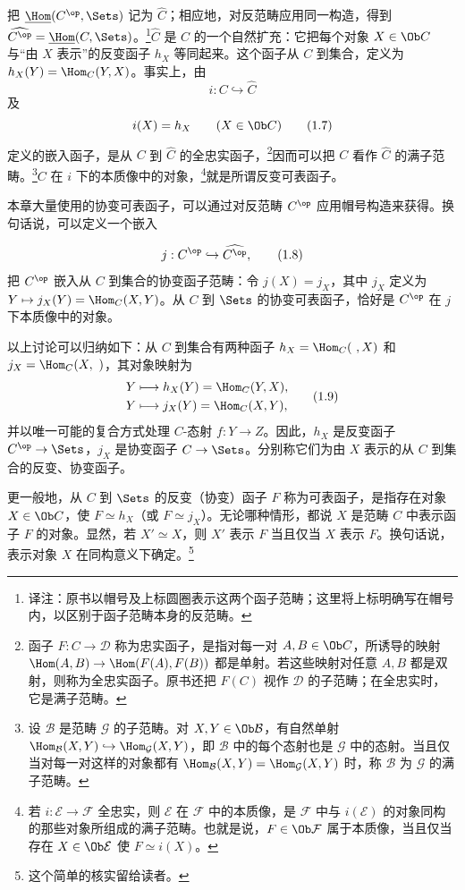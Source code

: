 把 $\underline{\Hom}(C^{\op},\Sets)$ 记为 $\widehat C$；相应地，对反范畴应用同一构造，得到 $\widehat{C^{\op}}=\underline{\Hom}(C,\Sets)$。\footnote{译注：原书以帽号及上标圆圈表示这两个函子范畴；这里将上标明确写在帽号内，以区别于函子范畴本身的反范畴。}$\widehat C$ 是 $C$ 的一个自然扩充：它把每个对象 $X\in\Ob C$ 与“由 $X$ 表示”的反变函子 $h_X$ 等同起来。这个函子从 $C$ 到集合，定义为 $h_X(Y)=\Hom_C(Y,X)$。事实上，由
\[
i:C\hookrightarrow\widehat C\tag{1.6}
\]
及
\[
i(X)=h_X\qquad(X\in\Ob C)\tag{1.7}
\]
定义的嵌入函子，是从 $C$ 到 $\widehat C$ 的全忠实函子，\footnote{函子 $F:C\to\mathcal D$ 称为忠实函子，是指对每一对 $A,B\in\Ob C$，所诱导的映射 $\Hom(A,B)\to\Hom(F(A),F(B))$ 都是单射。若这些映射对任意 $A,B$ 都是双射，则称为全忠实函子。原书还把 $F(C)$ 视作 $\mathcal D$ 的子范畴；在全忠实时，它是满子范畴。}因而可以把 $C$ 看作 $\widehat C$ 的满子范畴。\footnote{设 $\mathcal B$ 是范畴 $\mathcal G$ 的子范畴。对 $X,Y\in\Ob\mathcal B$，有自然单射 $\Hom_{\mathcal B}(X,Y)\hookrightarrow\Hom_{\mathcal G}(X,Y)$，即 $\mathcal B$ 中的每个态射也是 $\mathcal G$ 中的态射。当且仅当对每一对这样的对象都有 $\Hom_{\mathcal B}(X,Y)=\Hom_{\mathcal G}(X,Y)$ 时，称 $\mathcal B$ 为 $\mathcal G$ 的满子范畴。}$C$ 在 $i$ 下的本质像中的对象，\footnote{若 $i:\mathcal E\to\mathcal F$ 全忠实，则 $\mathcal E$ 在 $\mathcal F$ 中的本质像，是 $\mathcal F$ 中与 $i(\mathcal E)$ 的对象同构的那些对象所组成的满子范畴。也就是说，$F\in\Ob\mathcal F$ 属于本质像，当且仅当存在 $X\in\Ob\mathcal E$ 使 $F\simeq i(X)$。}就是所谓反变可表函子。

本章大量使用的协变可表函子，可以通过对反范畴 $C^{\op}$ 应用帽号构造来获得。换句话说，可以定义一个嵌入

\[
j:C^{\op}\hookrightarrow\widehat{C^{\op}},\tag{1.8}
\]
把 $C^{\op}$ 嵌入从 $C$ 到集合的协变函子范畴：令 $j(X)=j_X$，其中 $j_X$ 定义为 $Y\mapsto j_X(Y)=\Hom_C(X,Y)$。从 $C$ 到 $\Sets$ 的协变可表函子，恰好是 $C^{\op}$ 在 $j$ 下本质像中的对象。

以上讨论可以归纳如下：从 $C$ 到集合有两种函子 $h_X=\Hom_C(\ ,X)$ 和 $j_X=\Hom_C(X,\ )$，其对象映射为
\[
\begin{aligned}
Y&\longmapsto h_X(Y)=\Hom_C(Y,X),\\
Y&\longmapsto j_X(Y)=\Hom_C(X,Y),
\end{aligned}\tag{1.9}
\]
并以唯一可能的复合方式处理 $C$-态射 $f:Y\to Z$。因此，$h_X$ 是反变函子 $C^{\op}\to\Sets$，$j_X$ 是协变函子 $C\to\Sets$。分别称它们为由 $X$ 表示的从 $C$ 到集合的反变、协变函子。

更一般地，从 $C$ 到 $\Sets$ 的反变（协变）函子 $F$ 称为可表函子，是指存在对象 $X\in\Ob C$，使 $F\simeq h_X$（或 $F\simeq j_X$）。无论哪种情形，都说 $X$ 是范畴 $C$ 中表示函子 $F$ 的对象。显然，若 $X'\simeq X$，则 $X'$ 表示 $F$ 当且仅当 $X$ 表示 $F$。换句话说，表示对象 $X$ 在同构意义下确定。\footnote{这个简单的核实留给读者。}

